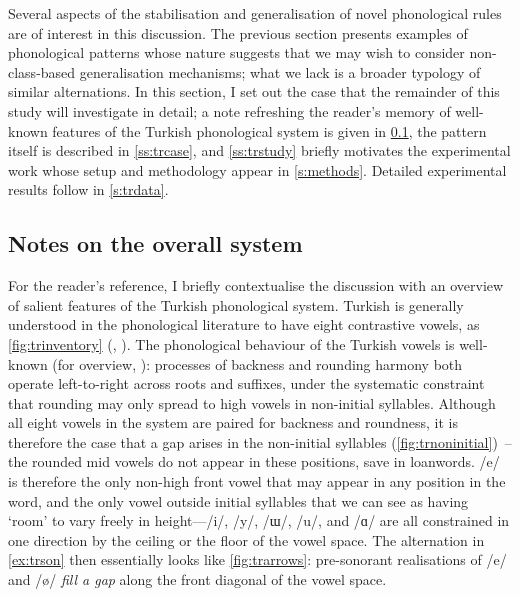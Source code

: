 Several aspects of the stabilisation and generalisation of novel phonological rules are of interest in this discussion. The previous section presents examples of phonological patterns whose nature suggests that we may wish to consider non-class-based generalisation mechanisms; what we lack is a broader typology of similar alternations. In this section, I set out the case that the remainder of this study will investigate in detail; a note refreshing the reader's memory of well-known features of the Turkish phonological system is given in \cref{sss:trphonology}, the pattern itself is described in \cref{ss:trcase}, and \cref{ss:trstudy} briefly motivates the experimental work whose setup and methodology appear in \cref{s:methods}. Detailed experimental results follow in \cref{s:trdata}.

\subsection{Notes on the overall system}\label{sss:trphonology}
For the reader's reference, I briefly contextualise the discussion with an overview of salient features of the Turkish phonological system. Turkish is generally understood in the phonological literature to have eight contrastive vowels, as \cref{fig:trinventory} (\citealt{Hulst1991}, \citealt{Kabak2011}). The phonological behaviour of the Turkish vowels is well-known (for overview, \citealt{Clements1982,Kabak2011}): processes of backness and rounding harmony both operate left-to-right across roots and suffixes, under the systematic constraint that rounding may only spread to high vowels in non-initial syllables. Although all eight vowels in the system are paired for backness and roundness, it is therefore the case that a gap arises in the non-initial syllables (\cref{fig:trnoninitial}) – the rounded mid vowels do not appear in these positions, save in loanwords. /e/ is therefore the only non-high front vowel that may appear in any position in the word, and the only vowel outside initial syllables that we can see as having `room' to vary freely in height---/i/, /y/, /ɯ/, /u/, and /ɑ/ are all constrained in one direction by the ceiling or the floor of the vowel space. The alternation in \cref{ex:trson} then essentially looks like \cref{fig:trarrows}: pre-sonorant realisations of /e/ and /ø/ \emph{fill a gap} along the front diagonal of the vowel space. \\

